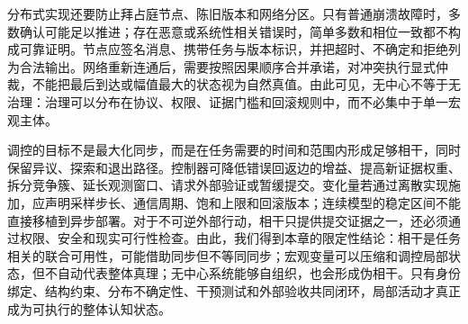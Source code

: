 分布式实现还要防止拜占庭节点、陈旧版本和网络分区。只有普通崩溃故障时，多数确认可能足以推进；存在恶意或系统性相关错误时，简单多数和相位一致都不构成可靠证明。节点应签名消息、携带任务与版本标识，并把超时、不确定和拒绝列为合法输出。网络重新连通后，需要按照因果顺序合并承诺，对冲突执行显式仲裁，不能把最后到达或幅值最大的状态视为自然真值。由此可见，无中心不等于无治理：治理可以分布在协议、权限、证据门槛和回滚规则中，而不必集中于单一宏观主体。

调控的目标不是最大化同步，而是在任务需要的时间和范围内形成足够相干，同时保留异议、探索和退出路径。控制器可降低错误回返边的增益、提高新证据权重、拆分竞争簇、延长观测窗口、请求外部验证或暂缓提交。变化量若通过离散实现施加，应声明采样步长、通信周期、饱和上限和回滚版本；连续模型的稳定区间不能直接移植到异步部署。对于不可逆外部行动，相干只提供提交证据之一，还必须通过权限、安全和现实可行性检查。由此，我们得到本章的限定性结论：相干是任务相关的联合可用性，可能借助同步但不等同同步；宏观变量可以压缩和调控局部状态，但不自动代表整体真理；无中心系统能够自组织，也会形成伪相干。只有身份绑定、结构约束、分布不确定性、干预测试和外部验收共同闭环，局部活动才真正成为可执行的整体认知状态。

